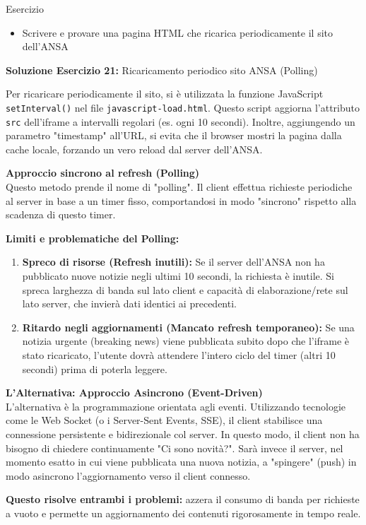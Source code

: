 \documentclass[11pt]{article}
\begin{document}
\begin{tcolorbox}[colback=blue!5!white,colframe=blue!75!black,title=\textbf{DOMANDA}, breakable]
Esercizio
\begin{itemize}
    \item Scrivere e provare una pagina HTML che ricarica periodicamente il sito dell'ANSA
\end{itemize}
\end{tcolorbox}

\begin{tcolorbox}[colback=green!5!white,colframe=green!75!black,title=\textbf{RISPOSTA}, breakable]
\textbf{Soluzione Esercizio 21:} Ricaricamento periodico sito ANSA (Polling)

Per ricaricare periodicamente il sito, si è utilizzata la funzione JavaScript \texttt{setInterval()} nel file \texttt{javascript-load.html}. Questo script aggiorna l'attributo \texttt{src} dell'iframe a intervalli regolari (es. ogni 10 secondi). Inoltre, aggiungendo un parametro "timestamp" all'URL, si evita che il browser mostri la pagina dalla cache locale, forzando un vero reload dal server dell'ANSA.

\textbf{Approccio sincrono al refresh (Polling)}\\
Questo metodo prende il nome di "polling". Il client effettua richieste periodiche al server in base a un timer fisso, comportandosi in modo "sincrono" rispetto alla scadenza di questo timer.

\textbf{Limiti e problematiche del Polling:}
\begin{enumerate}
    \item \textbf{Spreco di risorse (Refresh inutili):} Se il server dell'ANSA non ha pubblicato nuove notizie negli ultimi 10 secondi, la richiesta è inutile. Si spreca larghezza di banda sul lato client e capacità di elaborazione/rete sul lato server, che invierà dati identici ai precedenti.
    \item \textbf{Ritardo negli aggiornamenti (Mancato refresh temporaneo):} Se una notizia urgente (breaking news) viene pubblicata subito dopo che l'iframe è stato ricaricato, l'utente dovrà attendere l'intero ciclo del timer (altri 10 secondi) prima di poterla leggere.
\end{enumerate}

\textbf{L'Alternativa: Approccio Asincrono (Event-Driven)}\\
L'alternativa è la programmazione orientata agli eventi. Utilizzando tecnologie come le Web Socket (o i Server-Sent Events, SSE), il client stabilisce una connessione persistente e bidirezionale col server. 
In questo modo, il client non ha bisogno di chiedere continuamente "Ci sono novità?". Sarà invece il server, nel momento esatto in cui viene pubblicata una nuova notizia, a "spingere" (push) in modo asincrono l'aggiornamento verso il client connesso.

\textbf{Questo risolve entrambi i problemi:} azzera il consumo di banda per richieste a vuoto e permette un aggiornamento dei contenuti rigorosamente in tempo reale.
\end{tcolorbox}
\end{document}
